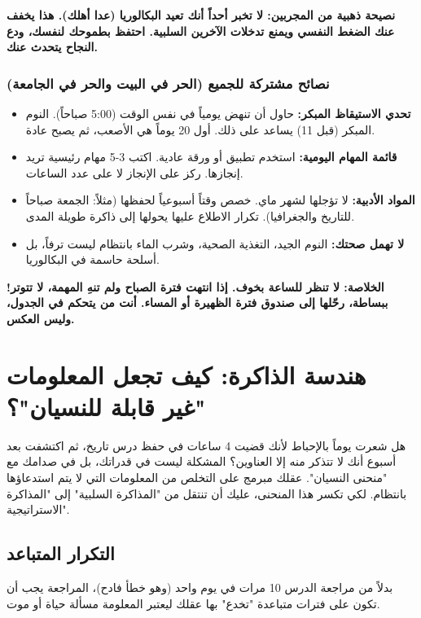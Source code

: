 \documentclass[12pt,a4paper]{book}
\newcommand{\importantAr}[1]{%
	\begin{important}
		\bfseries #1
	\end{important}
}
\begin{document}
	\importantAr{نصيحة ذهبية من المجربين: لا تخبر أحداً أنك تعيد البكالوريا (عدا أهلك). هذا يخفف عنك الضغط النفسي ويمنع تدخلات الآخرين السلبية. احتفظ بطموحك لنفسك، ودع النجاح يتحدث عنك.}
	
	\subsubsection{نصائح مشتركة للجميع (الحر في البيت والحر في الجامعة)}
	\label{sec:random-tips7}
	
	\begin{itemize}
		\item \textbf{تحدي الاستيقاظ المبكر:} حاول أن تنهض يومياً في نفس الوقت (5:00 صباحاً). النوم المبكر (قبل 11) يساعد على ذلك. أول 20 يوماً هي الأصعب، ثم يصبح عادة.
		\item \textbf{قائمة المهام اليومية:} استخدم تطبيق  أو ورقة عادية. اكتب 3-5 مهام رئيسية تريد إنجازها. ركز على الإنجاز لا على عدد الساعات.
		\item \textbf{المواد الأدبية:} لا تؤجلها لشهر ماي. خصص وقتاً أسبوعياً لحفظها (مثلاً: الجمعة صباحاً للتاريخ والجغرافيا). تكرار الاطلاع عليها يحولها إلى ذاكرة طويلة المدى.
		\item \textbf{لا تهمل صحتك:} النوم الجيد، التغذية الصحية، وشرب الماء بانتظام ليست ترفاً، بل أسلحة حاسمة في البكالوريا.
	\end{itemize}
	
	
	\importantAr{الخلاصة: لا تنظر للساعة بخوف. إذا انتهت فترة الصباح ولم تنهِ المهمة، لا تتوتر! ببساطة، رحّلها إلى صندوق فترة الظهيرة أو المساء. أنت من يتحكم في الجدول، وليس العكس.}
	
	\section{هندسة الذاكرة: كيف تجعل المعلومات "غير قابلة للنسيان"؟}
	
	هل شعرت يوماً بالإحباط لأنك قضيت 4 ساعات في حفظ درس تاريخ، ثم اكتشفت بعد أسبوع أنك لا تتذكر منه إلا العناوين؟ المشكلة ليست في قدراتك، بل في صدامك مع "منحنى النسيان". عقلك مبرمج على التخلص من المعلومات التي لا يتم استدعاؤها بانتظام. لكي تكسر هذا المنحنى، عليك أن تنتقل من "المذاكرة السلبية" إلى "المذاكرة الاستراتيجية".
	
	\subsection{ التكرار المتباعد }
	بدلاً من مراجعة الدرس 10 مرات في يوم واحد (وهو خطأ فادح)، المراجعة يجب أن تكون على فترات متباعدة "تخدع" بها عقلك ليعتبر المعلومة مسألة حياة أو موت.
	
\end{document}

